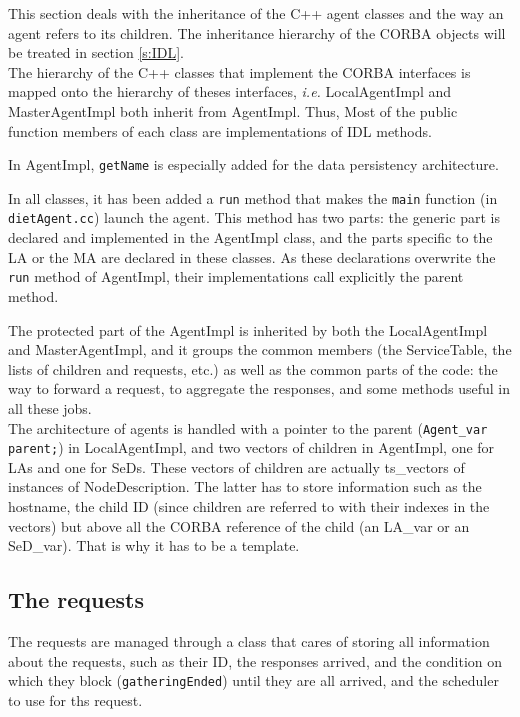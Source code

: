 This section deals with the inheritance of the C++ agent classes and the way an
agent refers to its children. The inheritance hierarchy of the CORBA objects
will be treated in section \ref{s:IDL}.
\\

The hierarchy of the C++ classes that implement the CORBA interfaces is mapped
onto the hierarchy of theses interfaces, \emph{i.e.} \textsf{LocalAgentImpl} and
\textsf{MasterAgentImpl} both inherit from \textsf{AgentImpl}. Thus, Most of the
public function members of each class are implementations of IDL methods.

In \textsf{AgentImpl}, \texttt{getName} is especially added for the data
persistency architecture.

In all classes, it has been added a \texttt{run} method that makes the
\texttt{main} function (in \texttt{dietAgent.cc}) launch the agent. This method
has two parts: the generic part is declared and implemented in the
\textsf{AgentImpl} class, and the parts specific to the LA or the MA are
declared in these classes. As these declarations overwrite the \texttt{run}
method of \textsf{AgentImpl}, their implementations call explicitly the parent
method.

The protected part of the \textsf{AgentImpl} is inherited by both the
\textsf{LocalAgentImpl} and \textsf{MasterAgentImpl}, and it groups the common
members (the \textsf{ServiceTable}, the lists of children and requests, etc.) as
well as the common parts of the code: the way to forward a request, to aggregate
the responses, and some methods useful in all these jobs.
\\

The architecture of agents is handled with a pointer to the parent
(\verb+Agent_var parent;+) in \textsf{LocalAgentImpl}, and two vectors of children
in \textsf{AgentImpl}, one for LAs and one for SeDs. These vectors of children are
actually \textsf{ts\_vectors} of instances of \textsf{NodeDescription}. The
latter has to store information such as the hostname, the child ID (since
children are referred to with their indexes in the vectors) but above all the
CORBA reference of the child (an \textsf{LA\_var} or an \textsf{SeD\_var}). That
is why it has to be a template.


\subsection{The requests}

The requests are managed through a class that cares of storing all information
about the requests, such as their ID, the responses arrived, and the condition
on which they block (\texttt{gatheringEnded}) until they are all arrived, and
the scheduler to use for ths request.


